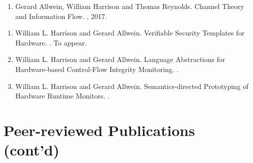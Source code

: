\documentclass[11pt]{article}
\begin{document}

\begin{enumerate}[leftmargin=0.0mm]


\item
Gerard Allwein, William Harrison and Thomas Reynolds.
\newblock Channel Theory and Information Flow.
, 2017.


\end{enumerate}




\begin{enumerate}[leftmargin=0.0mm]

\item 
William L. Harrison and Gerard Allwein.
\newblock Verifiable Security Templates for Hardware.
. To appear.



\item 
William L. Harrison and Gerard Allwein.
\newblock Language Abstractions for Hardware-based Control-Flow Integrity Monitoring.
.


\item 
William L. Harrison and Gerard Allwein.
\newblock Semantics-directed Prototyping of Hardware Runtime Monitors.
.
\end{enumerate}

\section{Peer-reviewed Publications (cont'd)}
\end{document}
